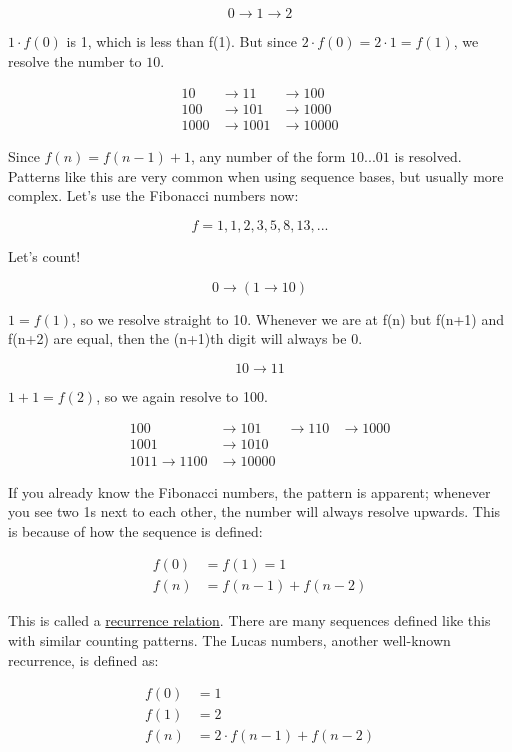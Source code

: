 \documentclass{article}
\begin{document}
$$0 \rightarrow 1 \rightarrow 2$$

\noindent $1 \cdot f(0)$ is 1, which is less than f(1). But since $2 \cdot f(0) = 2 \cdot 1 = f(1)$, we resolve the number to $10$.

\begin{align*}
10 &\rightarrow 11 &\rightarrow 100\\
100 &\rightarrow 101 &\rightarrow 1000\\
1000 &\rightarrow 1001 &\rightarrow 10000
\end{align*}

\noindent Since $f(n) = f(n-1) + 1$, any number of the form $10...01$ is resolved. Patterns like this are very common when using sequence bases, but usually more complex. Let's use the Fibonacci numbers now:

$$f = 1, 1, 2, 3, 5, 8, 13, ...$$

\noindent Let's count!

$$0 \rightarrow (1 \rightarrow 10)$$

\noindent $1 = f(1)$, so we resolve straight to 10. Whenever we are at f(n) but f(n+1) and f(n+2) are equal, then the (n+1)th digit will always be 0.

$$10 \rightarrow 11$$

\noindent $1 + 1 = f(2)$, so we again resolve to 100.

\begin{align*}
100 &\rightarrow 101 &\rightarrow 110 &\rightarrow 1000\\
1001 &\rightarrow 1010\\
1011 \rightarrow 1100 &\rightarrow 10000
\end{align*}

\noindent If you already know the Fibonacci numbers, the pattern is apparent; whenever you see two 1s next to each other, the number will always resolve upwards. This is because of how the sequence is defined:

\begin{align*}
f(0) &= f(1) = 1\\
f(n) &= f(n-1) + f(n-2)
\end{align*}

\noindent This is called a \underline{recurrence relation}. There are many sequences defined like this with similar counting patterns. The Lucas numbers, another well-known recurrence, is defined as:

\begin{align*}
f(0) &= 1\\
f(1) &= 2\\
f(n) &= 2 \cdot f(n-1) + f(n-2)
\end{align*}
\end{document}

